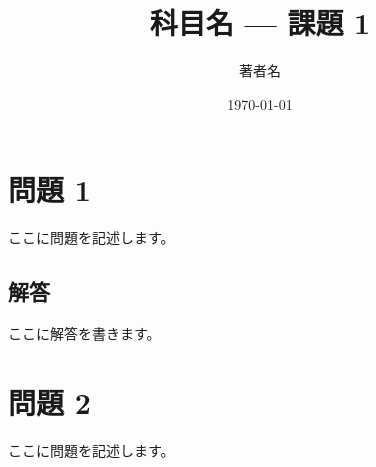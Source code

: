 \documentclass[11pt]{article}
\title{科目名 — 課題 1}
\author{著者名}
\date{\today}
\begin{document}
\maketitle

\section*{問題 1}
ここに問題を記述します。

\subsection*{解答}
ここに解答を書きます。

\section*{問題 2}
ここに問題を記述します。
\end{document}
